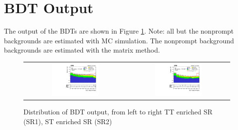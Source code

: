\section{BDT Output}
\label{sec:Output}

The output of the BDTs are shown in Figure \ref{fig:bdt_output}. Note: all but the nonprompt backgrounds are estimated with MC simulation. The nonprompt background backgrounds are estimated with the matrix method.

\begin{figure}[tbh!]
 \begin{center}
 \begin{tabular}{cc}
  \includegraphics[width=0.48\textwidth]{figures/Part3/BDT/BDT_TT}&
  \includegraphics[width=0.48\textwidth]{figures/Part3/BDT/BDT_ST}\\
 \end{tabular}
 \caption{Distribution of BDT output, from left to right TT enriched SR (SR1), ST enriched SR (SR2)}
 \label{fig:bdt_output}
 \end{center}
\end{figure}